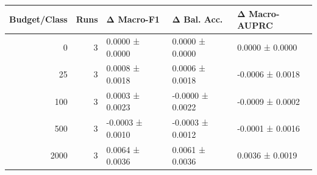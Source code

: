 \begin{tabular}{rrlll}
\toprule
Budget/Class & Runs & Δ Macro-F1 & Δ Bal. Acc. & Δ Macro-AUPRC \\
\midrule
0 & 3 & 0.0000 ± 0.0000 & 0.0000 ± 0.0000 & 0.0000 ± 0.0000 \\
25 & 3 & 0.0008 ± 0.0018 & 0.0006 ± 0.0018 & -0.0006 ± 0.0018 \\
100 & 3 & 0.0003 ± 0.0023 & -0.0000 ± 0.0022 & -0.0009 ± 0.0002 \\
500 & 3 & -0.0003 ± 0.0010 & -0.0003 ± 0.0012 & -0.0001 ± 0.0016 \\
2000 & 3 & 0.0064 ± 0.0036 & 0.0061 ± 0.0036 & 0.0036 ± 0.0019 \\
\bottomrule
\end{tabular}
